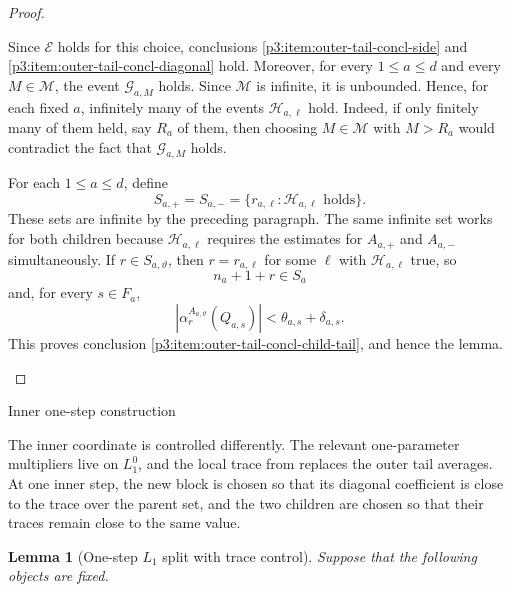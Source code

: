 \documentclass[11pt,reqno]{amsart}
\makeatletter
\theoremstyle{plain}
\newtheorem{lemma}[lemma]{Lemma}
\theoremstyle{definition}
\newcounter{problempaper}
\newenvironment{problempaperbody}{%
  \setcounter{subsection}{0}%
  \setcounter{subsubsection}{0}%
  \setcounter{paragraph}{0}%
  \renewcommand{\thesubsection}{\arabic{subsection}}%
  \renewcommand{\thesubsubsection}{\thesubsection.\arabic{subsubsection}}%
  \renewcommand{\theparagraph}{\thesubsubsection.\arabic{paragraph}}%
  \let\problem@outersection\section
  \let\problem@outersubsection\subsection
  \let\problem@outersubsubsection\subsubsection
  \let\problem@outerparagraph\paragraph
  \let\section\problem@papersection
  \let\subsection\problem@papersubsection
  \let\subsubsection\problem@papersubsubsection
}{%
  \let\section\problem@outersection
  \let\subsection\problem@outersubsection
  \let\subsubsection\problem@outersubsubsection
  \let\paragraph\problem@outerparagraph
}
\newcommand{\problem@target}[2]{%
  \hypertarget{problem-\theproblempaper-#1-#2}{}%
}
\newcommand{\problem@paperheading}[3]{%
  \par\bigskip
  \problem@target{#1}{#2}%
  \noindent{\large\bfseries #2.\quad #3\par}%
  \nobreak\smallskip
}
\newcommand{\problem@papersubheading}[3]{%
  \par\medskip
  \problem@target{#1}{#2}%
  \noindent{\normalsize\bfseries #2.\quad #3\par}%
  \nobreak\smallskip
}
\newcommand{\problem@papersubsubheading}[3]{%
  \par\smallskip
  \problem@target{#1}{#2}%
  \noindent{\normalsize\itshape #2.\quad #3.\ }%
}
\def\problem@papersection{%
  \@ifstar{\problem@papersectionstar}{\problem@papersectionnostar}%
}
\def\problem@papersectionstar#1{%
  \par\bigskip\noindent{\large\bfseries #1\par}\nobreak\smallskip
}
\def\problem@papersectionnostar#1{%
  \refstepcounter{subsection}%
  \setcounter{subsubsection}{0}%
  \setcounter{paragraph}{0}%
  \problem@paperheading{section}{\thesubsection}{#1}%
  \problem@writecontentsline{section}{\thesubsection}{#1}%
}
\def\problem@papersubsection{%
  \@ifstar{\problem@papersubsectionstar}{\problem@papersubsectionnostar}%
}
\def\problem@papersubsectionstar#1{%
  \par\medskip\noindent{\normalsize\bfseries #1\par}\nobreak\smallskip
}
\def\problem@papersubsectionnostar#1{%
  \refstepcounter{subsubsection}%
  \setcounter{paragraph}{0}%
  \problem@papersubheading{subsection}{\thesubsubsection}{#1}%
  \problem@writecontentsline{subsection}{\thesubsubsection}{#1}%
}
\def\problem@papersubsubsection{%
  \@ifstar{\problem@papersubsubsectionstar}{\problem@papersubsubsectionnostar}%
}
\def\problem@papersubsubsectionstar#1{%
  \par\smallskip\noindent{\normalsize\itshape #1.\ }%
}
\def\problem@papersubsubsectionnostar#1{%
  \refstepcounter{paragraph}%
  \problem@papersubsubheading{subsubsection}{\theparagraph}{#1}%
  \problem@writecontentsline{subsubsection}{\theparagraph}{#1}%
}
\newcommand{\problem@writecontentsline}[3]{%
  \begingroup
  \protected@write\@auxout{}{%
    \string\problemcontentsentry{\theproblempaper}{#1}{#2}{#3}{\thepage}%
  }%
  \endgroup
}
\newcommand{\problemcontentsentry}[5]{%
  \@ifundefined{problemcontents@#1}{%
    \expandafter\gdef\csname problemcontents@#1\endcsname{}%
  }{}%
  \expandafter\g@addto@macro\csname problemcontents@#1\endcsname{%
    \problemcontentsline{#1}{#2}{#3}{#4}{#5}%
  }%
}
\newcommand{\problemcontentslink}[4]{%
  \hyperlink{problem-#1-#2-#3}{#4}%
}
\newcommand{\problemcontentsline}[5]{%
  \ifstrequal{#2}{section}{%
    \par\noindent
    \problemcontentslink{#1}{#2}{#3}{\makebox[2.5em][l]{#3}#4}%
    \nobreak\dotfill
    \problemcontentslink{#1}{#2}{#3}{#5}\par
  }{%
    \ifstrequal{#2}{subsection}{%
      \par\noindent\hspace*{1.5em}%
      \problemcontentslink{#1}{#2}{#3}{\makebox[3.5em][l]{#3}#4}%
      \nobreak\dotfill
      \problemcontentslink{#1}{#2}{#3}{#5}\par
    }{%
      \par\noindent\hspace*{3em}%
      \problemcontentslink{#1}{#2}{#3}{\makebox[4.5em][l]{#3}#4}%
      \nobreak\dotfill
      \problemcontentslink{#1}{#2}{#3}{#5}\par
    }%
  }%
}
\makeatother
\begin{document}
\begin{problempaperbody}
\begin{proof}
\begin{description}
Since $\mathcal E$ holds for this choice, conclusions \ref{p3:item:outer-tail-concl-side} and \ref{p3:item:outer-tail-concl-diagonal} hold. Moreover, for every $1\leq a\leq d$ and every $M\in\mathcal M$, the event $\mathcal G_{a,M}$ holds. Since $\mathcal M$ is infinite, it is unbounded. Hence, for each fixed $a$, infinitely many of the events $\mathcal H_{a,\ell}$ hold. Indeed, if only finitely many of them held, say $R_a$ of them, then choosing $M\in\mathcal M$ with $M>R_a$ would contradict the fact that $\mathcal G_{a,M}$ holds.

For each $1\leq a\leq d$, define
\begin{equation*}
        S_{a,+}=S_{a,-}=\{r_{a,\ell}:\mathcal H_{a,\ell}\text{ holds}\}.
\end{equation*}
These sets are infinite by the preceding paragraph. The same infinite set works for both children because $\mathcal H_{a,\ell}$ requires the estimates for $A_{a,+}$ and $A_{a,-}$ simultaneously. If $r\in S_{a,\vartheta}$, then $r=r_{a,\ell}$ for some $\ell$ with $\mathcal H_{a,\ell}$ true, so
\begin{equation*}
        n_a+1+r\in S_a
\end{equation*}
and, for every $s\in F_a$,
\begin{equation*}
        |\alpha_r^{A_{a,\vartheta}}(Q_{a,s})|<\theta_{a,s}+\delta_{a,s}.
\end{equation*}
This proves conclusion \ref{p3:item:outer-tail-concl-child-tail}, and hence the lemma.
\end{description}
\end{proof}

\subsection{Inner one-step construction}
\label{p3:sec:inner-one-step-construction}

The inner coordinate is controlled differently. The relevant one-parameter multipliers live on $L_1^0$, and the local trace from  replaces the outer tail averages. At one inner step, the new block is chosen so that its diagonal coefficient is close to the trace over the parent set, and the two children are chosen so that their traces remain close to the same value.

\begin{lemma}[One-step $L_1$ split with trace control]
\label{p3:lem:l1-one-step}
Suppose that the following objects are fixed.


\end{lemma}
\end{problempaperbody}
\end{document}
